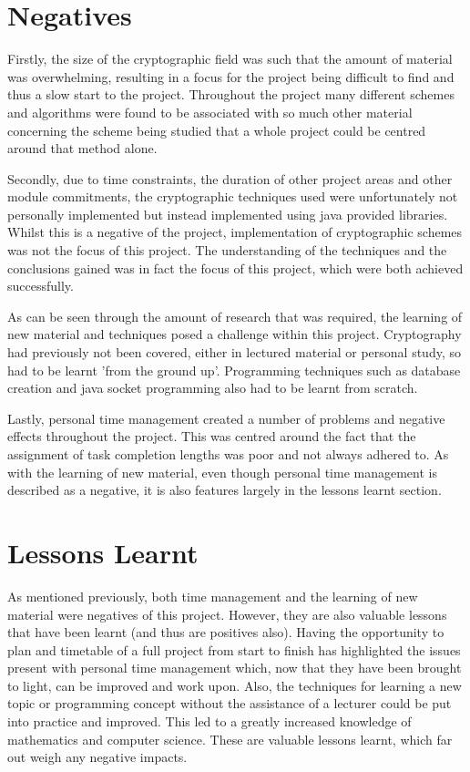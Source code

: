 \documentclass[a4paper,12pt]{report}
\begin{document}
\section{Negatives}

Firstly, the size of the cryptographic field was such that the amount of material was overwhelming, resulting in a focus for the project being difficult to find and thus a slow start to the project. Throughout the project many different schemes and algorithms were found to be associated with so much other material concerning the scheme being studied that a whole project could be centred around that method alone. 

Secondly, due to time constraints, the duration of other project areas and other module commitments, the cryptographic techniques used were unfortunately not personally implemented but instead implemented using java provided libraries. Whilst this is a negative of the project, implementation of cryptographic schemes was not the focus of this project. The understanding of the techniques and the conclusions gained was in fact the focus of this project, which were both achieved successfully. 

As can be seen through the amount of research that was required, the learning of new material and techniques posed a challenge within this project. Cryptography had previously not been covered, either in lectured material or personal study, so had to be learnt 'from the ground up'. Programming techniques such as database creation and java socket programming also had to be learnt from scratch.

Lastly, personal time management created a number of problems and negative effects throughout the project. This was centred around the fact that the assignment of task completion lengths was poor and not always adhered to. As with the learning of new material, even though personal time management is described as a negative, it is also features largely in the lessons learnt section.

\section{Lessons Learnt}

As mentioned previously, both time management and the learning of new material were negatives of this project. However, they are also valuable lessons that have been learnt (and thus are positives also). Having the opportunity to plan and timetable of a full project from start to finish has highlighted the issues present with personal time management which, now that they have been brought to light, can be improved and work upon. Also, the techniques for learning a new topic or programming concept without the assistance of a lecturer could be put into practice and improved. This led to a greatly increased knowledge of mathematics and computer science. These are valuable lessons learnt, which far out weigh any negative impacts.  
\end{document}
